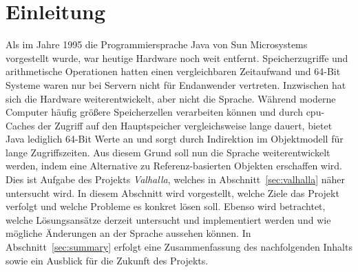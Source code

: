 \section{Einleitung}\label{sec:introduction}

Als im Jahre 1995 die Programmiersprache Java von Sun Microsystems vorgestellt wurde, war heutige Hardware noch weit entfernt.
Speicherzugriffe und arithmetische Operationen hatten einen vergleichbaren Zeitaufwand und 64-Bit Systeme waren nur bei Servern nicht für Endanwender vertreten.
Inzwischen hat sich die Hardware weiterentwickelt, aber nicht die Sprache.
Während moderne Computer häufig größere Speicherzellen verarbeiten können und durch \ac{cpu}-Caches der Zugriff auf den Hauptspeicher vergleichsweise lange dauert, bietet Java lediglich 64-Bit Werte an und sorgt durch Indirektion im Objektmodell für lange Zugriffszeiten.
Aus diesem Grund soll nun die Sprache weiterentwickelt werden, indem eine Alternative zu Referenz-basierten Objekten erschaffen wird.
Dies ist Aufgabe des Projekts \emph{Valhalla}, welches in Abschnitt~\ref{sec:valhalla} näher untersucht wird.
In diesem Abschnitt wird vorgestellt, welche Ziele das Projekt verfolgt und welche Probleme es konkret lösen soll.
Ebenso wird betrachtet, welche Lösungsansätze derzeit untersucht und implementiert werden und wie mögliche Änderungen an der Sprache aussehen können.
In Abschnitt~\ref{sec:summary} erfolgt eine Zusammenfassung des nachfolgenden Inhalts sowie ein Ausblick für die Zukunft des Projekts.
